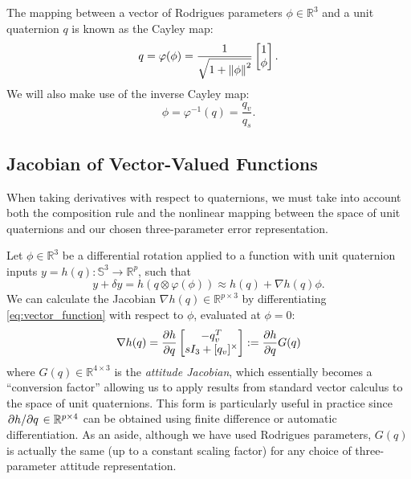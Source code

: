 \documentclass[letterpaper, 10 pt, conference]{ieeeconf}  %
\newcommand{\R}{\mathbb{R}}
\newcommand{\Q}{\mathbb{S}^3}
\newcommand{\skewmat}[1]{[#1]^\times}
\begin{document}
    The mapping between a vector of Rodrigues parameters $\phi \in \R^3$ and a unit
    quaternion $q$ is known as the Cayley map:
    \begin{equation} \label{eq:cayley}
        q = \varphi(\phi) = \frac{1}{\sqrt{1 + \norm{\phi}^2}} \begin{bmatrix} 1 \\ \phi \end{bmatrix}.
    \end{equation}
    We will also make use of the inverse Cayley map:
    \begin{equation} \label{eq:invcayley}
        \phi = \varphi^{-1}(q) = \frac{q_v}{q_s}.
    \end{equation}

    \subsection{Jacobian of Vector-Valued Functions}
        When taking derivatives with respect to quaternions, we must take into account
        both the composition rule and the nonlinear mapping between the space of unit
        quaternions and our chosen three-parameter error representation.

        Let $\phi \in \R^3$ be a differential rotation applied to a function with
        unit quaternion inputs $y = h(q): \Q \to \R^p$, such that
        \begin{equation} \label{eq:vector_function}
            y + \delta y = h(q \otimes \varphi(\phi)) \approx h(q) +  \nabla h(q) \phi.
        \end{equation}
        We can calculate the Jacobian $\nabla h(q) \in \R^{p \times 3}$ by
        differentiating \eqref{eq:vector_function} with respect to $\phi$, evaluated at
        $\phi = 0$:
        \begin{equation} \label{eq:quat_gradient}
            \nabla h(q) = \pdv{h}{q} \begin{bmatrix} 
                            -q_v^T \\ 
                            sI_3 + \skewmat{q_v}
                        \end{bmatrix}
                        := \pdv{h}{q} G(q) 
        \end{equation}
        where $G(q) \in \R^{4 \times 3}$ is the \textit{attitude Jacobian}, which
        essentially becomes a ``conversion factor'' allowing us to apply results from
        standard vector calculus to the space of unit quaternions. This form is
        particularly useful in practice since $\pdv*{h}{q} \in \R^{p \times 4}$ can be
        obtained using finite difference or automatic differentiation.
        As an aside, although we have used Rodrigues parameters, $G(q)$ is actually the
        same (up to a constant scaling factor) for any choice of three-parameter attitude
        representation.
\end{document}

